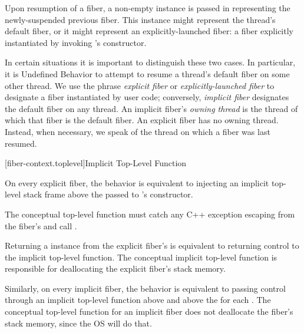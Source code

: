 Upon resumption of a fiber, a non-empty \fiber instance is passed in
representing the newly-suspended previous fiber. This \fiber instance might
represent the thread's default fiber, or it might represent an
explicitly-launched fiber: a fiber explicitly instantiated by
invoking \fiber's constructor.

In certain situations it is important to distinguish these two cases. In
particular, it is Undefined Behavior to attempt to resume a thread's default
fiber on some other thread. We use the phrase \emph{explicit fiber}
or \emph{explicitly-launched fiber} to designate a fiber instantiated by user
code; conversely, \emph{implicit fiber} designates the default fiber on any
thread. An implicit fiber's \emph{owning thread} is the thread of which that
fiber is the default fiber. An explicit fiber has no owning thread. Instead,
when necessary, we speak of the thread on which a fiber was last resumed.

[fiber-context.toplevel]{Implicit Top-Level Function}

On every explicit fiber, the behavior is equivalent to injecting an implicit top-level stack
frame above the \entryfn passed to \fiber's constructor.

The conceptual top-level function must catch any C++ exception escaping from the
fiber's \entryfn and call .

Returning a \fiber instance from the explicit fiber's \entryfn is equivalent
to returning control to the implicit top-level function.
The
conceptual implicit top-level function is responsible for deallocating the
explicit fiber's stack memory.

Similarly, on every implicit fiber, the behavior is equivalent to passing control through an
implicit top-level function above \main and above the \entryfn for
each \thread.
The conceptual top-level
function for an implicit fiber does not deallocate the fiber's stack memory,
since the OS will do that.

